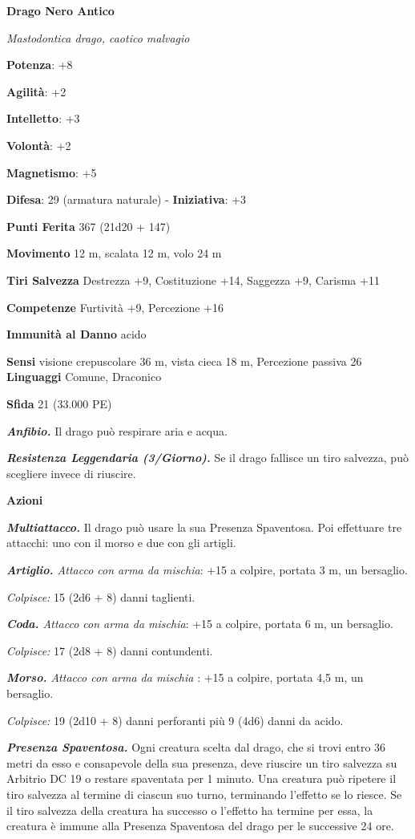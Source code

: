 \begin{multicols}{2}
\textbf{Drago Nero Antico}

\emph{Mastodontica drago, caotico malvagio}

\textbf{Potenza}: +8

\textbf{Agilità}: +2

\textbf{Intelletto}: +3

\textbf{Volontà}: +2

\textbf{Magnetismo}: +5

\textbf{Difesa}: 29 (armatura naturale) - \textbf{Iniziativa}: +3

\textbf{Punti Ferita} 367 (21d20 + 147)

\textbf{Movimento} 12 m, scalata 12 m, volo 24 m

\textbf{Tiri Salvezza} Destrezza +9, Costituzione +14, Saggezza +9,
Carisma +11

\textbf{Competenze} Furtività +9, Percezione +16

\textbf{Immunità al Danno} acido

\textbf{Sensi} visione crepuscolare 36 m, vista cieca 18 m, Percezione passiva
26 \textbf{Linguaggi} Comune, Draconico

\textbf{Sfida} 21 (33.000 PE)

\emph{\textbf{Anfibio.}} Il drago può respirare aria e acqua.

\emph{\textbf{Resistenza Leggendaria (3/Giorno).}} Se il drago fallisce
un tiro salvezza, può scegliere invece di riuscire.

\textbf{Azioni}

\emph{\textbf{Multiattacco.}} Il drago può usare la sua Presenza
Spaventosa. Poi effettuare tre attacchi: uno con il morso e due con gli
artigli.

\emph{\textbf{Artiglio.} Attacco con arma da mischia}: +15 a colpire,
portata 3 m, un bersaglio.

\emph{Colpisce:} 15 (2d6 + 8) danni taglienti.

\emph{\textbf{Coda.} Attacco con arma da mischia}: +15 a colpire,
portata 6 m, un bersaglio.

\emph{Colpisce:} 17 (2d8 + 8) danni contundenti.

\emph{\textbf{Morso.} Attacco con arma da mischia} : +15 a colpire,
portata 4,5 m, un bersaglio.

\emph{Colpisce:} 19 (2d10 + 8) danni perforanti più 9 (4d6) danni da
acido.

\emph{\textbf{Presenza Spaventosa.}} Ogni creatura scelta dal drago, che
si trovi entro 36 metri da esso e consapevole della sua presenza, deve
riuscire un tiro salvezza su Arbitrio DC 19 o restare spaventata per 1
minuto. Una creatura può ripetere il tiro salvezza al termine di ciascun
suo turno, terminando l'effetto se lo riesce. Se il tiro salvezza della
creatura ha successo o l'effetto ha termine per essa, la creatura è
immune alla Presenza Spaventosa del drago per le successive 24 ore.


\end{multicols}

